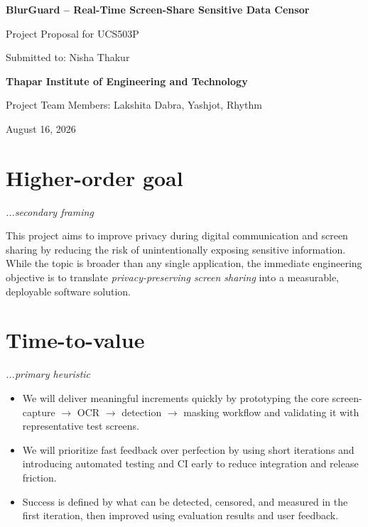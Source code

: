 \documentclass[12pt,a4paper]{article}
\begin{document}

\begin{center}
    {\bfseries\fontsize{16}{18.5}\selectfont
    BlurGuard -- Real-Time Screen-Share Sensitive Data Censor\par}

    \vspace{6pt}
    {\fontsize{10.5}{12.5}\selectfont Project Proposal for UCS503P\par}
    {\fontsize{10.5}{12.5}\selectfont Submitted to: Nisha Thakur\par}
    {\bfseries\fontsize{10.7}{12.5}\selectfont
    Thapar Institute of Engineering and Technology\par}

    \vspace{17pt}
    {\fontsize{10.4}{12.5}\selectfont
    Project Team Members: Lakshita Dabra, Yashjot, Rhythm\par}

    \vspace{6pt}
    {\fontsize{10.4}{12.5}\selectfont August 16, 2026\par}
\end{center}

\vspace{10pt}

\section{Higher-order goal}
\hfill{\itshape\fontsize{8.3}{9.5}\selectfont ...secondary framing}

This project aims to improve privacy during digital communication and screen sharing by reducing the risk of unintentionally exposing sensitive information. While the topic is broader than any single application, the immediate engineering objective is to translate \textit{privacy-preserving screen sharing} into a measurable, deployable software solution.

\section{Time-to-value}
\hfill{\itshape\fontsize{8.3}{9.5}\selectfont ...primary heuristic}

\begin{itemize}
    \item We will deliver meaningful increments quickly by prototyping the core screen-capture $\rightarrow$ OCR $\rightarrow$ detection $\rightarrow$ masking workflow and validating it with representative test screens.

    \item We will prioritize fast feedback over perfection by using short iterations and introducing automated testing and CI early to reduce integration and release friction.

    \item Success is defined by what can be detected, censored, and measured in the first iteration, then improved using evaluation results and user feedback.
\end{itemize}
\end{document}
